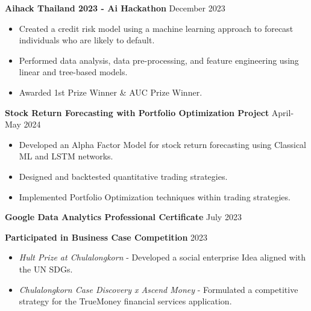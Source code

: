 \documentclass[11pt]{article}
\begin{document}
\textbf{Aihack Thailand 2023 - Ai Hackathon} \hfill December 2023
\begin{itemize}[noitemsep, topsep=0pt, partopsep=0pt, parsep=0pt]
    \item Created a credit risk model using a machine learning approach to forecast individuals who are likely to default.
    \item Performed data analysis, data pre-processing, and feature engineering using linear and tree-based models.
    \item Awarded 1st Prize Winner \& AUC Prize Winner.
\end{itemize}

\vspace{3pt}

\textbf{Stock Return Forecasting with Portfolio Optimization Project} \hfill April-May 2024
\begin{itemize}[noitemsep, topsep=0pt, partopsep=0pt, parsep=0pt]
    \item Developed an Alpha Factor Model for stock return forecasting using Classical ML and LSTM networks.
    \item Designed and backtested quantitative trading strategies.
    \item Implemented Portfolio Optimization techniques within trading strategies.
\end{itemize}

\vspace{3pt}

\textbf{Google Data Analytics Professional Certificate} \hfill July 2023

\vspace{3pt}

\textbf{Participated in Business Case Competition} \hfill 2023
\begin{itemize}[noitemsep, topsep=0pt, partopsep=0pt, parsep=0pt]
    \item \textit{Hult Prize at Chulalongkorn} - Developed a social enterprise Idea aligned with the UN SDGs.
    \item \textit{Chulalongkorn Case Discovery x Ascend Money} - Formulated a competitive strategy for the TrueMoney financial services application.
\end{itemize}


\end{document}

